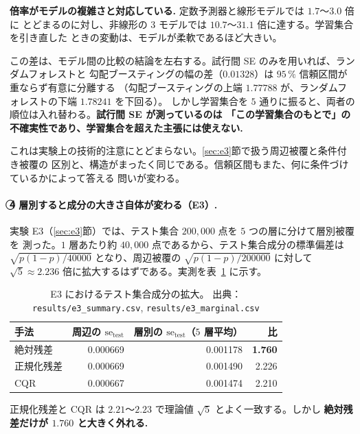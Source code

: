 \documentclass[a4paper,11pt]{jsarticle}
\theoremstyle{definition}
\theoremstyle{plain}
\theoremstyle{remark}
\newcommand{\encircle}[1]{\textcircled{\scriptsize #1}}   %
\begin{document}
\textbf{倍率がモデルの複雑さと対応している.} 定数予測器と線形モデルでは $1.7$〜$3.0$ 倍に
とどまるのに対し、非線形の $3$ モデルでは $10.7$〜$31.1$ 倍に達する。学習集合を引き直した
ときの変動は、モデルが柔軟であるほど大きい。

この差は、モデル間の比較の結論を左右する。試行間 SE のみを用いれば、ランダムフォレストと
勾配ブースティングの幅の差（$0.01328$）は $95\,\%$ 信頼区間が重ならず有意に分離する
（勾配ブースティングの上端 $1.77788$ が、ランダムフォレストの下端 $1.78241$ を下回る）。
しかし学習集合を $5$ 通りに振ると、両者の順位は入れ替わる。\textbf{試行間 SE が測っているのは
「この学習集合のもとで」の不確実性であり、学習集合を超えた主張には使えない.}

これは実験上の技術的注意にとどまらない。\ref{sec:e3}節で扱う周辺被覆と条件付き被覆の
区別と、構造がまったく同じである。信頼区間もまた、何に条件づけているかによって答える
問いが変わる。

\paragraph{\encircle{4} 層別すると成分の大きさ自体が変わる（E3）.}
実験 E3（\ref{sec:e3}節）では、テスト集合 $200{,}000$ 点を $5$ つの層に分けて層別被覆を
測った。$1$ 層あたり約 $40{,}000$ 点であるから、テスト集合成分の標準偏差は
$\sqrt{p(1-p)/40000}$ となり、周辺被覆の $\sqrt{p(1-p)/200000}$ に対して
$\sqrt5\approx2.236$ 倍に拡大するはずである。実測を表~\ref{tab:e3-se-test} に示す。

\begin{table}[htbp]
  \centering
  \caption{E3 におけるテスト集合成分の拡大。
    出典：\texttt{results/e3\_summary.csv}, \texttt{results/e3\_marginal.csv}}
  \label{tab:e3-se-test}
  \begin{tabular}{lrrr}
    \toprule
    手法 & 周辺の $\mathrm{se}_{\mathrm{test}}$ & 層別の $\mathrm{se}_{\mathrm{test}}$（$5$ 層平均） & 比 \\
    \midrule
    絶対残差 & 0.000669 & 0.001178 & \textbf{1.760} \\
    正規化残差 & 0.000669 & 0.001490 & 2.226 \\
    CQR & 0.000667 & 0.001474 & 2.210 \\
    \bottomrule
  \end{tabular}
\end{table}

正規化残差と CQR は $2.21$〜$2.23$ で理論値 $\sqrt5$ とよく一致する。しかし
\textbf{絶対残差だけが $1.760$ と大きく外れる.}
\end{document}
